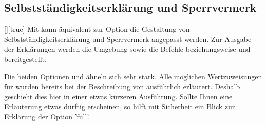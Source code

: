 \subsection{Selbstständigkeitserklärung und Sperrvermerk}
\begin{Declaration}{[\PSet]}[true]%
\printdeclarationlist%
%
%
Mit  kann äquivalent zur Option  die 
Gestaltung von Selbstständigkeitserklärung und Sperrvermerk angepasst werden.
Zur Ausgabe der Erklärungen werden die Umgebung  
sowie die Befehle  beziehungsweise  und 
 bereitgestellt. 

Die beiden Optionen  und  ähneln sich sehr 
stark. Alle möglichen Wertzuweisungen für  wurden bereits 
bei der Beschreibung von  ausführlich erläutert. Deshalb 
geschieht dies hier in einer etwas kürzeren Ausführung. Sollte Ihnen eine 
Erläuterung etwas dürftig erscheinen, so hilft mit Sicherheit ein Blick zur 
Erklärung der Option 'full'.


\end{Declaration}
